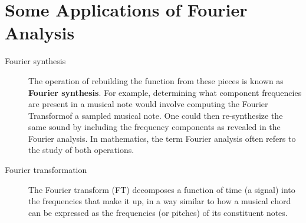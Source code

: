 \documentclass{article}
\newcommand{\FT}{Fourier Transform}
\begin{document}
\section{Some Applications of Fourier Analysis}
\begin{description}
    \item[Fourier synthesis] The operation of rebuilding the function from these pieces is known as \textbf{Fourier synthesis}. For example, determining what component frequencies are present in a musical note would involve computing the \FT of a sampled musical note. One could then re-synthesize the same sound by including the frequency components as revealed in the Fourier analysis. In mathematics, the term Fourier analysis often refers to the study of both operations. 
    
    \item[Fourier transformation] The Fourier transform (FT) decomposes a function of time (a signal) into the frequencies that make it up, in a way similar to how a musical chord can be expressed as the frequencies (or pitches) of its constituent notes.
\end{description}
\end{document}
